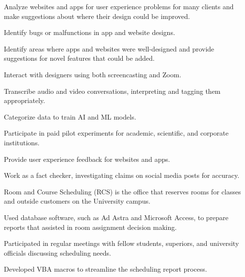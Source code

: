 \documentclass[]{deedy-resume-openfont}
\begin{document}
\begin{tightemize}
\item Analyze websites and apps for user experience problems for many clients and make suggestions about where their design could be improved.
\item Identify bugs or malfunctions in app and website designs.
\item Identify areas where apps and websites were well-designed and provide suggestions for novel features that could be added.
\item Interact with designers using both screencasting and Zoom.
\end{tightemize}
\sectionsep

\begin{tightemize}
\item Transcribe audio and video conversations, interpreting and tagging them appropriately.
\item Categorize data to train AI and ML models.
\item Participate in paid pilot experiments for academic, scientific, and corporate institutions.
\item Provide user experience feedback for websites and apps.
\item Work as a fact checker, investigating claims on social media posts for accuracy.
\end{tightemize}
\sectionsep

\begin{tightemize}
\item Room and Course Scheduling (RCS) is the office that reserves rooms for classes and outside customers on the University campus.
\item Used database software, such as Ad Astra and Microsoft Access, to prepare reports that assisted in room assignment decision making.
\item Participated in regular meetings with fellow students, superiors, and university officials discussing scheduling needs.
\item Developed VBA macros to streamline the scheduling report process.
\end{tightemize}
\sectionsep
\end{document}
